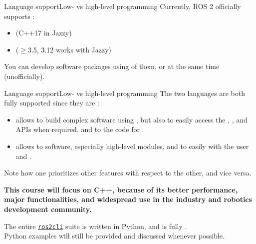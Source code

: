 \begin{frame}{Language support}{Low- vs high-level programming}
  Currently, ROS 2 officially supports :
  \begin{itemize}
    \item {} (C++17 in Jazzy)
    \item {} ($\geq$3.5, 3.12 works with Jazzy)
  \end{itemize}
  You can develop software packages using  of them, or  at the same time (unofficially).
\end{frame}
\begin{frame}{Language support}{Low- vs high-level programming}
  The two languages are both fully supported since they are :
  \begin{itemize}
    \item {} allows to build complex software using , but also to easily access the , , and  APIs when required, and to  the code for .
    \item {} allows to  software, especially high-level modules, and to easily  with the user and .
  \end{itemize}
  Note how one prioritizes other features with respect to the other, and vice versa.
  \begin{block}{}
    \centering
    \textbf{This course will focus on C++, because of its better performance, major functionalities, and widespread use in the industry and robotics development community.}
  \end{block}
  The entire \href{https://github.com/ros2/ros2cli/tree/jazzy}{\color{blue}\underline{\texttt{ros2cli}}} suite is written in Python, and is fully .\\
  Python examples will still be provided and discussed whenever possible.
\end{frame}
